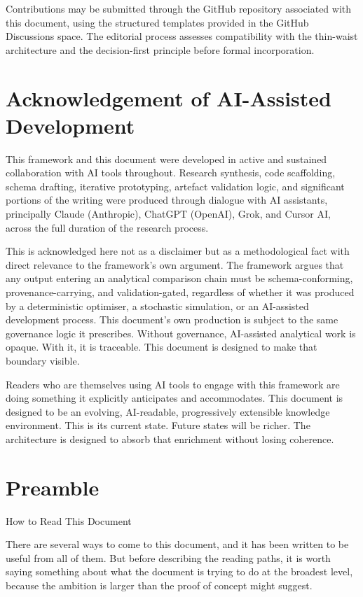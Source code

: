 \documentclass[
  11pt,
  a4paper,
  twoside,
  openright]{scrbook}
\begin{document}
Contributions may be submitted through the GitHub repository associated
with this document, using the structured templates provided in the
GitHub Discussions space. The editorial process assesses compatibility
with the thin-waist architecture and the decision-first principle before
formal incorporation.

\chapter{Acknowledgement of AI-Assisted
Development}\label{acknowledgement-of-ai-assisted-development}

This framework and this document were developed in active and sustained
collaboration with AI tools throughout. Research synthesis, code
scaffolding, schema drafting, iterative prototyping, artefact validation
logic, and significant portions of the writing were produced through
dialogue with AI assistants, principally Claude (Anthropic), ChatGPT
(OpenAI), Grok, and Cursor AI, across the full duration of the research
process.

This is acknowledged here not as a disclaimer but as a methodological
fact with direct relevance to the framework's own argument. The
framework argues that any output entering an analytical comparison chain
must be schema-conforming, provenance-carrying, and validation-gated,
regardless of whether it was produced by a deterministic optimiser, a
stochastic simulation, or an AI-assisted development process. This
document's own production is subject to the same governance logic it
prescribes. Without governance, AI-assisted analytical work is opaque.
With it, it is traceable. This document is designed to make that
boundary visible.

Readers who are themselves using AI tools to engage with this framework
are doing something it explicitly anticipates and accommodates. This
document is designed to be an evolving, AI-readable, progressively
extensible knowledge environment. This is its current state. Future
states will be richer. The architecture is designed to absorb that
enrichment without losing coherence.

\chapter{Preamble}\label{preamble}

How to Read This Document

\hfill\break

There are several ways to come to this document, and it has been written
to be useful from all of them. But before describing the reading paths,
it is worth saying something about what the document is trying to do at
the broadest level, because the ambition is larger than the proof of
concept might suggest.
\end{document}
